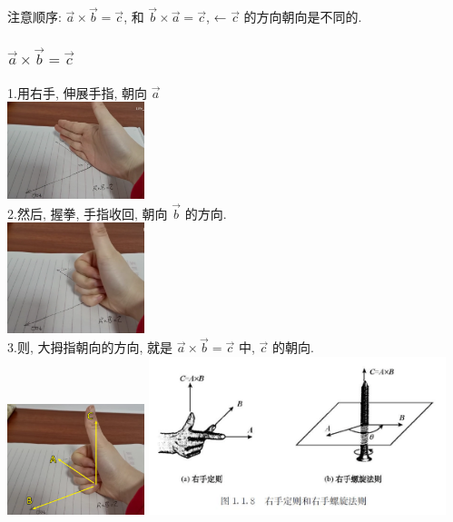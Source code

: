 \documentclass[UTF8]{ctexart}
\begin{document}
注意顺序: $\vec{a} \times \vec{b} = \vec{c}$, 和 $\vec{b} \times \vec{a} = \vec{c}$, ← $\vec{c}$ 的方向朝向是不同的.

\subsubsection{$\vec{a} \times \vec{b} = \vec{c}$}

1.用右手, 伸展手指, 朝向  $\vec{a}$ \\
\includegraphics[width=0.3\textwidth]{img/0082.png}\\

2.然后, 握拳, 手指收回, 朝向  $\vec{b}$ 的方向. \\
\includegraphics[width=0.3\textwidth]{img/0083.png}\\

3.则, 大拇指朝向的方向, 就是 $\vec{a} \times \vec{b} = \vec{c}$ 中, $\vec{c}$ 的朝向. \\
\includegraphics[width=0.3\textwidth]{img/0084.png}
\includegraphics[width=0.65\textwidth]{img/0089.jpg}\\
\end{document}
